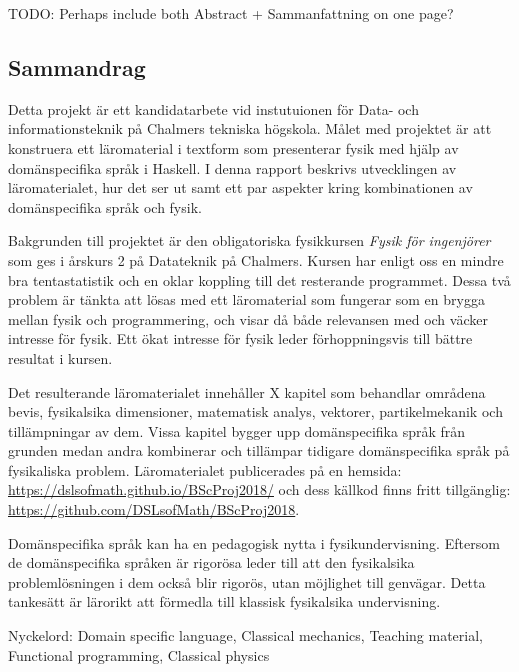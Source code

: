 
\thispagestyle{plain}			%

TODO: Perhaps include both Abstract + Sammanfattning on one page?

\begin{binge}

\section*{Sammandrag}

Detta projekt är ett kandidatarbete vid instutuionen för Data- och
informationsteknik på Chalmers tekniska högskola. Målet med projektet är att
konstruera ett läromaterial i textform som presenterar fysik med hjälp av
domänspecifika språk i Haskell. I denna rapport beskrivs utvecklingen av
läromaterialet, hur det ser ut samt ett par aspekter kring kombinationen av
domänspecifika språk och fysik.

Bakgrunden till projektet är den obligatoriska fysikkursen \textit{Fysik för
ingenjörer} som ges i årskurs 2 på Datateknik på Chalmers. Kursen har enligt oss
en mindre bra tentastatistik och en oklar koppling till det resterande
programmet. Dessa två problem är tänkta att lösas med ett läromaterial som
fungerar som en brygga mellan fysik och programmering, och visar då både
relevansen med och väcker intresse för fysik. Ett ökat intresse för fysik leder
förhoppningsvis till bättre resultat i kursen.

Det resulterande läromaterialet innehåller X kapitel som behandlar områdena
bevis, fysikalsika dimensioner, matematisk analys, vektorer, partikelmekanik och
tillämpningar av dem. Vissa kapitel bygger upp domänspecifika språk från grunden
medan andra kombinerar och tillämpar tidigare domänspecifika språk på
fysikaliska problem. Läromaterialet publicerades på en hemsida:
\url{https://dslsofmath.github.io/BScProj2018/} och dess källkod finns fritt
tillgänglig: \url{https://github.com/DSLsofMath/BScProj2018}.

Domänspecifika språk kan ha en pedagogisk nytta i fysikundervisning. Eftersom de
domänspecifika språken är rigorösa leder till att den fysikalsika
problemlösningen i dem också blir rigorös, utan möjlighet till genvägar. Detta
tankesätt är lärorikt att förmedla till klassisk fysikalsika undervisning.

\vfill
Nyckelord: Domain specific language, Classical mechanics, Teaching material, Functional programming, Classical physics

\end{binge}

\newpage				%
\thispagestyle{empty}
\mbox{}
